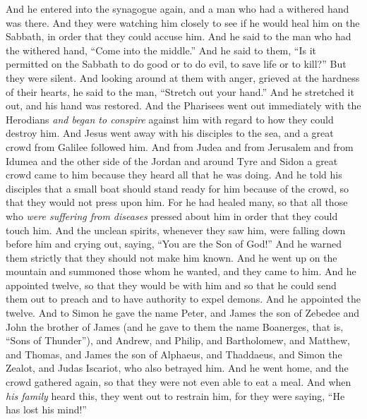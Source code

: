 \begin{biblechapter} %
 And he entered into the synagogue again, and a man who had a withered hand was there.
\verse And they were watching him closely to see if he would heal him on the Sabbath, in order that they could accuse him.
\verse And he said to the man who had the withered hand, “Come into the middle.”
\verse And he said to them, “Is it permitted on the Sabbath to do good or to do evil, to save life or to kill?” But they were silent.
\verse And looking around at them with anger, grieved at the hardness of their hearts, he said to the man, “Stretch out your hand.” And he stretched it out, and his hand was restored.
\verse And the Pharisees went out immediately with the Herodians \textit{and began to conspire} against him with regard to how they could destroy him.
 And Jesus went away with his disciples to the sea, and a great crowd from Galilee followed him. And from Judea
\verse and from Jerusalem and from Idumea and the other side of the Jordan and around Tyre and Sidon a great crowd came to him because they heard all that he was doing.
\verse And he told his disciples that a small boat should stand ready for him because of the crowd, so that they would not press upon him.
\verse For he had healed many, so that all those who \textit{were suffering from diseases} pressed about him in order that they could touch him.
\verse And the unclean spirits, whenever they saw him, were falling down before him and crying out, saying, “You are the Son of God!”
\verse And he warned them strictly that they should not make him known.
 And he went up on the mountain and summoned those whom he wanted, and they came to him.
\verse And he appointed twelve, so that they would be with him and so that he could send them out to preach
\verse and to have authority to expel demons.
\verse And he appointed the twelve. And to Simon he gave the name Peter,
\verse and James the son of Zebedee and John the brother of James (and he gave to them the name Boanerges, that is, “Sons of Thunder”),
\verse and Andrew, and Philip, and Bartholomew, and Matthew, and Thomas, and James the son of Alphaeus, and Thaddaeus, and Simon the Zealot,
\verse and Judas Iscariot, who also betrayed him.
 And he went home, and the crowd gathered again, so that they were not even able to eat a meal.
\verse And when \textit{his family} heard this, they went out to restrain him, for they were saying, “He has lost his mind!”

\end{biblechapter}
